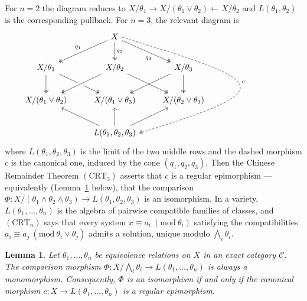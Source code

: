 \documentclass[11pt,a4paper]{article}
\theoremstyle{plain}
\newtheorem{lemme}[theoreme]{Lemma}
\theoremstyle{definition}
\theoremstyle{remark}
\theoremstyle{plain}
\newcommand{\md}[1]{\ (\mathrm{mod}\ #1)}
\begin{document}
For $n = 2$ the diagram reduces to
$X/\theta_1 \to X/(\theta_1 \vee \theta_2) \leftarrow X/\theta_2$ and
$L(\theta_1,\theta_2)$ is the corresponding pullback. For $n = 3$, the
relevant diagram is
\begin{equation}\label{cube2}
\begin{tikzcd}[column sep=1.2em, row sep=2.2em]
& & X
\arrow[dll, two heads, "q_1"']
\arrow[d, two heads, "q_2"]
\arrow[drr, two heads, "q_3"'{pos=0.65}]
\arrow[ddd, dashed, two heads, "c",
to path={(\tikztostart.east) .. controls +(6.2,-1.9) and +(6.2,1.9) ..
(\tikztotarget.east)\tikztonodes}] & & \\
X/\theta_1
\arrow[d, two heads]
\arrow[drr, two heads] & &
X/\theta_2
\arrow[dll, two heads, crossing over]
\arrow[drr, two heads, crossing over] & &
X/\theta_3
\arrow[dll, two heads]
\arrow[d, two heads] \\
X/(\theta_1 \vee \theta_2) & &
X/(\theta_1 \vee \theta_3) & &
X/(\theta_2 \vee \theta_3) \\
& & L(\theta_1, \theta_2, \theta_3)
\arrow[ull]
\arrow[u]
\arrow[urr] & &
\end{tikzcd}
\end{equation}
where $L(\theta_1,\theta_2,\theta_3)$ is the limit of the two middle rows
and the dashed morphism $c$ is the canonical one, induced by the cone
$(q_1, q_2, q_3)$. Then the Chinese Remainder Theorem $(\mathrm{CRT}_3)$ asserts that $c$ is a regular
epimorphism --- equivalently (Lemma~\ref{lem:mono} below), that the
comparison
$\Phi \colon X/(\theta_1 \wedge \theta_2 \wedge \theta_3) \to
L(\theta_1,\theta_2,\theta_3)$ is an isomorphism. In a variety,
$L(\theta_1,\dots,\theta_n)$ is the algebra of pairwise compatible families
of classes, and $(\mathrm{CRT}_n)$ says that every system
$x \equiv a_i \md{\theta_i}$ satisfying the compatibilities
$a_i \equiv a_j \md{\theta_i \vee \theta_j}$ admits a solution, unique
modulo $\bigwedge_i \theta_i$.

\begin{lemme}\label{lem:mono}
Let $\theta_1, \dots, \theta_n$ be equivalence relations on $X$ in an exact category $\mathcal C$. The comparison
morphism $\Phi \colon X/\bigwedge_i \theta_i \to L(\theta_1,\dots,\theta_n)$
is always a monomorphism. Consequently, $\Phi$ is an isomorphism if and only
if the canonical morphism $c \colon X \to L(\theta_1,\dots,\theta_n)$ is a
regular epimorphism.
\end{lemme}
\end{document}
